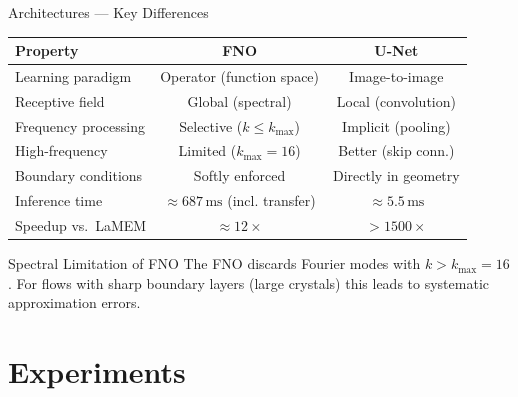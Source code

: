 \documentclass[aspectratio=169, 10pt]{beamer}
\begin{document}
\begin{frame}{Architectures — Key Differences}
  \begin{center}
  \begin{tabular}{lcc}
    \toprule
    \textbf{Property} & \textcolor{fnocolor}{\textbf{FNO}} & \textcolor{unetcolor}{\textbf{U-Net}} \\
    \midrule
    Learning paradigm    & Operator (function space) & Image-to-image \\
    Receptive field      & Global (spectral)          & Local (convolution) \\
    Frequency processing & Selective ($k \leq k_\text{max}$) & Implicit (pooling) \\
    High-frequency       & Limited ($k_\text{max}=16$) & Better (skip conn.) \\
    Boundary conditions  & Softly enforced            & Directly in geometry \\
    Inference time       & ${\approx}687\,\text{ms}$ (incl. transfer) & ${\approx}5{.}5\,\text{ms}$ \\
    Speedup vs.\ LaMEM  & ${\approx}12\times$         & ${>}1500\times$ \\
    \bottomrule
  \end{tabular}
  \end{center}

  \vspace{0.5em}
  \begin{alertblock}{Spectral Limitation of FNO}
    The FNO discards Fourier modes with $k > k_\text{max} = 16$. For flows
    with sharp boundary layers (large crystals) this leads to systematic
    approximation errors.
  \end{alertblock}
\end{frame}

\section{Experiments}
\end{document}
